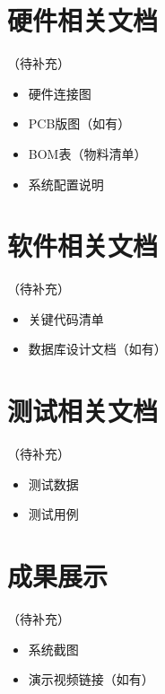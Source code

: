 
\appendix

\section{硬件相关文档}
（待补充）
\begin{itemize}
    \item 硬件连接图
    \item PCB版图（如有）
    \item BOM表（物料清单）
    \item 系统配置说明
\end{itemize}

\section{软件相关文档}
（待补充）
\begin{itemize}
    \item 关键代码清单
    \item 数据库设计文档（如有）
\end{itemize}

\section{测试相关文档}
（待补充）
\begin{itemize}
    \item 测试数据
    \item 测试用例
\end{itemize}

\section{成果展示}
（待补充）
\begin{itemize}
    \item 系统截图
    \item 演示视频链接（如有）
\end{itemize}
